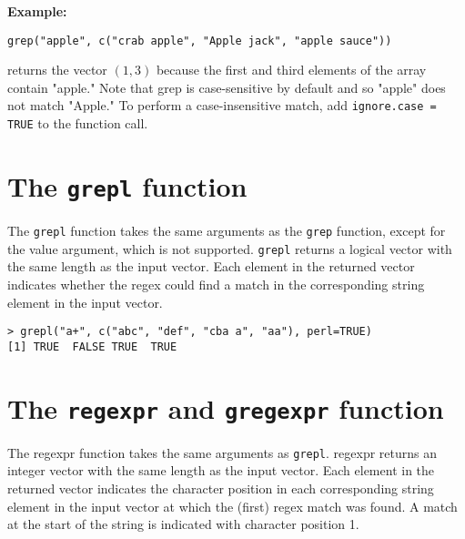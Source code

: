 \documentclass{article}
\begin{document}
\textbf{Example:}
\begin{framed}
\begin{verbatim}
grep("apple", c("crab apple", "Apple jack", "apple sauce"))
\end{verbatim}
\end{framed}
returns the vector $(1, 3)$ because the first and third elements of the array contain "apple." Note that grep is case-sensitive by default and so "apple" does not match "Apple." To perform a case-insensitive match, add \texttt{ignore.case = TRUE} to the function call.

\section{The \texttt{grepl} function }
The \texttt{grepl} function takes the same arguments as the \texttt{grep}  function, except for the value argument, which is not supported. \texttt{grepl} returns a logical vector with the same length as the input vector. Each element in the returned vector indicates whether the regex could find a match in the corresponding string element in the input vector.

\begin{framed}
\begin{verbatim}
> grepl("a+", c("abc", "def", "cba a", "aa"), perl=TRUE)
[1] TRUE  FALSE TRUE  TRUE
\end{verbatim}
\end{framed}
\section{The \texttt{regexpr} and \texttt{gregexpr} function }


The regexpr function takes the same arguments as \texttt{grepl}. regexpr returns an integer vector with the same length as the input vector. Each element in the returned vector indicates the character position in each corresponding string element in the input vector at which the (first) regex match was found. A match at the start of the string is indicated with character position 1.
\end{document}
